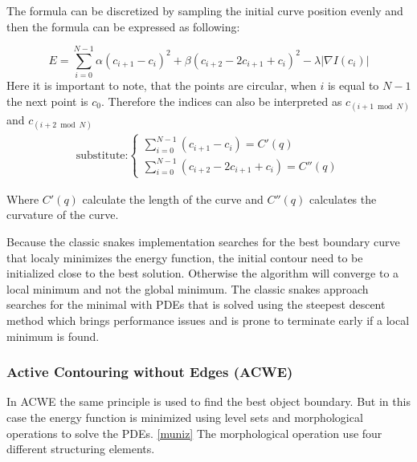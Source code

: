 The formula can be discretized by sampling the initial curve position evenly and then the formula can be expressed as following: 

\begin{equation}
    E = \sum_{i=0}^{N-1} \alpha (c_{i+1} - c_i)^2 + \beta (c_{i+2} - 2c_{i+1} + c_i)^2 - \lambda |\nabla I (c_i)|
\end{equation}
Here it is important to note, that the points are circular, when $i$ is equal to $N-1$ the next point is $c_0$. Therefore the indices can also be interpreted as $c_{(i+1 \bmod N)}$ and $c_{(i+2 \bmod N)}$
\begin{align*}
    \text {substitute:} \begin{cases}
    \sum_{i=0}^{N-1}(c_{i+1} - c_i) = C'(q) \\
    \sum_{i=0}^{N-1}(c_{i+2} - 2c_{i+1} + c_i) = C''(q)
    \end{cases}
\end{align*}

Where $C'(q)$ calculate the length of the curve and $C''(q)$ calculates the curvature of the curve.  

Because the classic snakes implementation searches for the best boundary curve that localy minimizes the energy function, the initial contour need to be initialized close to the best solution. Otherwise the algorithm will converge to a local minimum and not the global minimum. The classic snakes approach searches for the minimal with PDEs that is solved using the steepest descent method which brings performance issues and is prone to terminate early if a local minimum is found. 

\subsubsection{Active Contouring without Edges (ACWE)}
In ACWE the same principle is used to find the best object boundary. But in this case the energy function is minimized using level sets and morphological operations to solve the PDEs. \ref{muniz} The morphological operation use four different structuring elements. 

